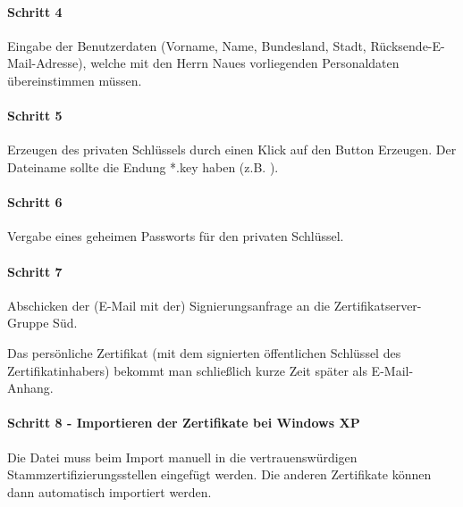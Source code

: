 \paragraph{Schritt 4}

Eingabe der Benutzerdaten (Vorname, Name, Bundesland, Stadt,
Rücksende-E-Mail-Adresse), welche mit den Herrn Naues vorliegenden Personaldaten
übereinstimmen müssen.

\paragraph{Schritt 5}

Erzeugen des privaten Schlüssels durch einen Klick auf den Button \glqq{}Erzeugen\grqq{}.
Der Dateiname sollte die Endung *.key haben (z.B. ).

\paragraph{Schritt 6}

Vergabe eines geheimen Passworts für den privaten Schlüssel.

\paragraph{Schritt 7}

Abschicken der (E-Mail mit der) Signierungsanfrage an die
Zertifikatserver-Gruppe Süd.

Das persönliche Zertifikat (mit dem signierten öffentlichen Schlüssel des
Zertifikatinhabers) bekommt man schließlich kurze Zeit später als E-Mail-Anhang.

\paragraph{Schritt 8 - Importieren der Zertifikate bei Windows XP}

Die Datei  muss beim Import manuell in die
vertrauenswürdigen Stammzertifizierungsstellen eingefügt werden. Die anderen
Zertifikate können dann automatisch importiert werden.

